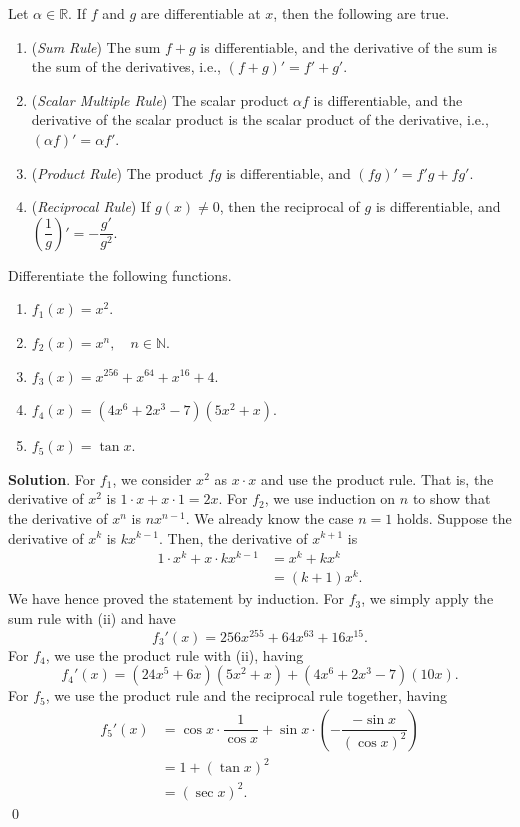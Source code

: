 \documentclass[11pt]{book}
\theoremstyle{break}
\theoremstyle{no_label}
\newcommand{\bbR}{\mathbb{R}}
\newcommand{\bbN}{\mathbb{N}}
\numberwithin{equation}{section}
\begin{document}
\setlength{\delimitershortfall}{0pt}
\begin{theorem}\label{diff_op}
    Let $\alpha\in\bbR$. If $f$ and $g$ are differentiable at $x$, then the following are true.
    \begin{enumerate}
        \item (\textit{Sum Rule}) The sum $f+g$ is differentiable, and the derivative of the sum is the sum of the derivatives, i.e., $(f+g)'=f'+g'$.
        \item (\textit{Scalar Multiple Rule}) The scalar product $\alpha f$ is differentiable, and the derivative of the scalar product is the scalar product of the derivative, i.e., $(\alpha f)'=\alpha f'$.
        \item (\textit{Product Rule}) The product $fg$ is differentiable, and $(fg)'=f'g+fg'$.
        \item (\textit{Reciprocal Rule}) If $g(x)\ne 0$, then the reciprocal of $g$ is differentiable, and $\left(\dfrac{1}{g}\right)'=-\dfrac{g'}{g^2}$.
    \end{enumerate}
\end{theorem}

\begin{example}
    Differentiate the following functions.
    \begin{enumerate}
        \item $f_1(x)=x^2$.
        \item $f_2(x)=x^n, \quad n\in\bbN$.
        \item $f_3(x)=x^{256}+x^{64}+x^{16}+4$.
        \item $f_4(x)=(4x^6+2x^3-7)(5x^2+x)$.
        \item $f_5(x)=\tan x$.
    \end{enumerate}
\end{example}
\textbf{Solution}. For $f_1$, we consider $x^2$ as $x\cdot x$ and use the product rule. That is, the derivative of $x^2$ is $1\cdot x+x\cdot 1=2x$. For $f_2$, we use induction on $n$ to show that the derivative of $x^n$ is $nx^{n-1}$. We already know the case $n=1$ holds. Suppose the derivative of $x^k$ is $kx^{k-1}$. Then, the derivative of $x^{k+1}$ is \begin{align*}
    1\cdot x^k+x\cdot kx^{k-1}&=x^k+kx^k\\
    &=(k+1)x^k.
\end{align*} We have hence proved the statement by induction. For $f_3$, we simply apply the sum rule with (ii) and have $${f_3}'(x)=256x^{255}+64x^{63}+16x^{15}.$$ For $f_4$, we use the product rule with (ii), having $${f_4}'(x)=(24x^5+6x)(5x^2+x)+(4x^6+2x^3-7)(10x).$$ For $f_5$, we use the product rule and the reciprocal rule together, having \begin{align*}
    {f_5}'(x)&=\cos x\cdot\dfrac{1}{\cos x}+\sin x\cdot\left(-\dfrac{-\sin x}{(\cos x)^2}\right)\\
    &=1+(\tan x)^2\\
    &=(\sec x)^2.
\end{align*} \qed
\setlength{\delimitershortfall}{13.5pt}
\end{document}
